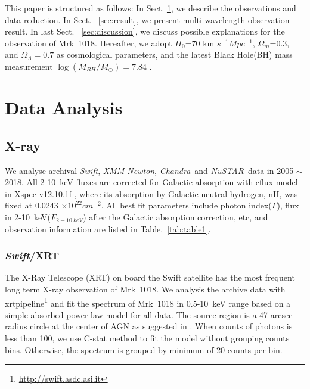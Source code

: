 \documentclass{aastex63}
\newcommand{\xmm}{{\em XMM-Newton}}
\newcommand{\nustar}{{\em NuSTAR}}
\newcommand{\chandra}{{\em Chandra}}
\newcommand{\swift}{{\em Swift}}
\begin{document}
This paper is structured as follows: In Sect. \ref{sec:data}, we describe the observations and data reduction. In Sect. ~\ref{sec:result}, we present multi-wavelength observation result. In last Sect. ~\ref{sec:discussion}, we discuss possible explanations for the observation of Mrk~1018. Hereafter, we adopt $H_0$=70 km $s^{-1} Mpc^{-1}$, $\Omega_{m}$=0.3, and $\Omega_{\Lambda}=0.7 $ as cosmological parameters, and the latest Black Hole(BH) mass measurement $\log(M_{BH}/M_{\odot})=7.84$ \citep{2017MNRAS.472.3492E,2018MNRAS.480.3898N}. 


\section{Data Analysis}\label{sec:data}
\subsection{X-ray}
We analyse archival \swift, \xmm, \chandra~and \nustar~data in 2005 $\sim$ 2018. All 2-10~keV fluxes are corrected for Galactic absorption with cflux model in Xspec v12.10.1f \citep{1996ASPC..101...17A}, where its absorption by Galactic neutral hydrogen, nH, was fixed at 0.0243 $\times 10^{22} cm^{-2}$\citep[see ][]{2016A&A...593L...9H}. All best fit parameters include photon index($\Gamma$), flux in 2-10~keV($F_{2-10~keV}$) after the Galactic absorption correction, etc, and observation information are listed in Table.~\ref{tab:table1}.


\subsubsection{\swift/XRT}
The X-Ray Telescope (XRT) on board the Swift satellite has the most frequent long term X-ray observation of Mrk~1018. We analysis the archive data with xrtpipeline\footnote{\url{http://swift.asdc.asi.it}} and fit the spectrum of Mrk~1018 in 0.5-10~keV range based on a simple absorbed power-law model for all data.  The source region is a 47-arcsec-radius circle at the center of AGN as suggested in \citet{2009MNRAS.397.1177E}. When counts of photons is less than 100, we use C-stat method to fit the model without grouping counts bins. Otherwise, the spectrum is grouped by minimum of 20 counts per bin. 
\end{document}
